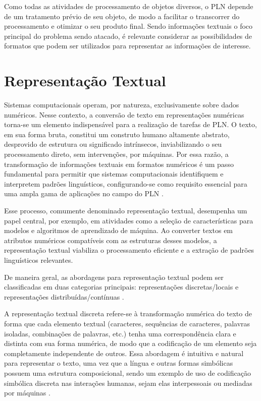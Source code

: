Como todas as atividades de processamento de objetos diversos, o \ac{PLN} depende de um tratamento prévio de seu objeto, de modo a facilitar o transcorrer do processamento e otimizar o seu produto final. Sendo informações textuais o foco principal do problema sendo atacado, é relevante considerar as possibilidades de formatos que podem ser utilizados para representar as informações de interesse.

\section{Representação Textual}
\label{sec:Teorico.2}
Sistemas computacionais operam, por natureza, exclusivamente sobre dados numéricos. Nesse contexto, a conversão de texto em representações numéricas torna-se um elemento indispensável para a realização de tarefas de \ac{PLN}. O texto, em sua forma bruta, constitui um construto humano altamente abstrato, desprovido de estrutura ou significado intrínsecos, inviabilizando o seu processamento direto, sem intervenções, por máquinas. Por essa razão, a transformação de informações textuais em formatos numéricos é um passo fundamental para permitir que sistemas computacionais identifiquem e interpretem padrões linguísticos, configurando-se como requisito essencial para uma ampla gama de aplicações no campo do \ac{PLN} \cite{Representacao-Texto:1}.

Esse processo, comumente denominado representação textual, desempenha um papel central, por exemplo, em atividades como a seleção de características para modelos e algoritmos de aprendizado de máquina. Ao converter textos em atributos numéricos compatíveis com as estruturas desses modelos, a representação textual viabiliza o processamento eficiente e a extração de padrões linguísticos relevantes.

De maneira geral, as abordagens para representação textual podem ser classificadas em duas categorias principais: representações discretas/locais \cite{Representacao-Texto:4} e representações distribuídas/contínuas \cite{Representacao-Texto:1,Representacao-Discreta:1,Representacao-Distribuida:3}.

A representação textual discreta refere-se à transformação numérica do texto de forma que cada elemento textual (caracteres, sequências de caracteres, palavras isoladas, combinações de palavras, etc.) tenha uma correspondência clara e distinta com sua forma numérica, de modo que a codificação de um elemento seja completamente independente de outros. Essa abordagem é intuitiva e natural para representar o texto, uma vez que a língua e outras formas simbólicas possuem uma estrutura composicional, sendo um exemplo de uso de codificação simbólica discreta nas interações humanas, sejam elas interpessoais ou mediadas por máquinas \cite{Representacao-Discreta:1}.

